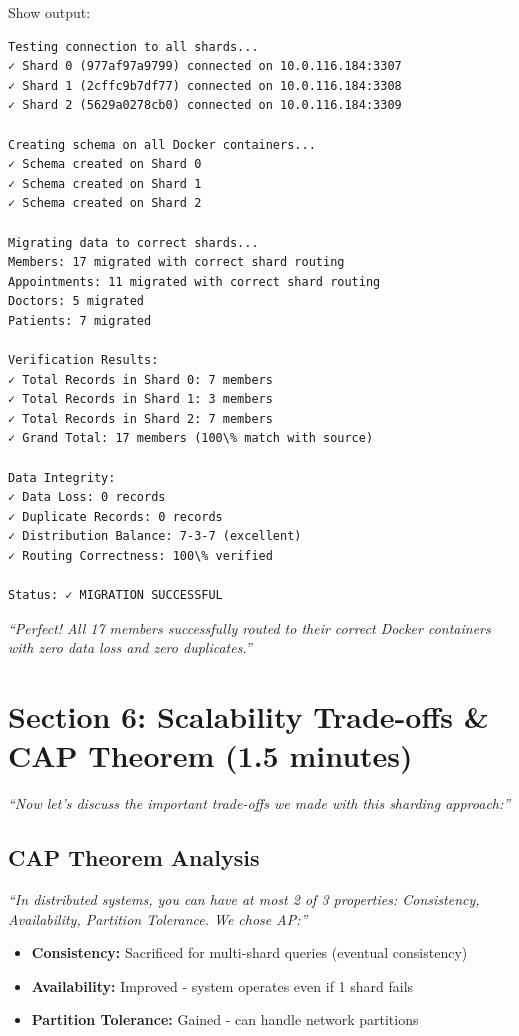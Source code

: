 \documentclass[12pt]{article}
\begin{document}
Show output:
\begin{lstlisting}
Testing connection to all shards...
✓ Shard 0 (977af97a9799) connected on 10.0.116.184:3307
✓ Shard 1 (2cffc9b7df77) connected on 10.0.116.184:3308
✓ Shard 2 (5629a0278cb0) connected on 10.0.116.184:3309

Creating schema on all Docker containers...
✓ Schema created on Shard 0
✓ Schema created on Shard 1
✓ Schema created on Shard 2

Migrating data to correct shards...
Members: 17 migrated with correct shard routing
Appointments: 11 migrated with correct shard routing
Doctors: 5 migrated
Patients: 7 migrated

Verification Results:
✓ Total Records in Shard 0: 7 members
✓ Total Records in Shard 1: 3 members
✓ Total Records in Shard 2: 7 members
✓ Grand Total: 17 members (100\% match with source)

Data Integrity:
✓ Data Loss: 0 records
✓ Duplicate Records: 0 records
✓ Distribution Balance: 7-3-7 (excellent)
✓ Routing Correctness: 100\% verified

Status: ✓ MIGRATION SUCCESSFUL
\end{lstlisting}

\textit{``Perfect! All 17 members successfully routed to their correct Docker containers with zero data loss and zero duplicates.''}

\section{Section 6: Scalability Trade-offs \& CAP Theorem (1.5 minutes)}

\textit{``Now let's discuss the important trade-offs we made with this sharding approach:''}

\subsection*{CAP Theorem Analysis}

\textit{``In distributed systems, you can have at most 2 of 3 properties: Consistency, Availability, Partition Tolerance. We chose AP:''}

\begin{itemize}
    \item \textbf{Consistency:} Sacrificed for multi-shard queries (eventual consistency)
    \item \textbf{Availability:} Improved - system operates even if 1 shard fails
    \item \textbf{Partition Tolerance:} Gained - can handle network partitions
\end{itemize}
\end{document}
